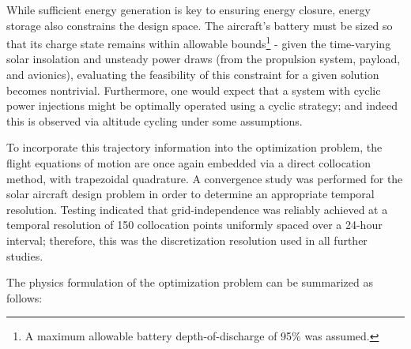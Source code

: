 While sufficient energy generation is key to ensuring energy closure, energy storage also constrains the design space. The aircraft's battery must be sized so that its charge state remains within allowable bounds\footnote{A maximum allowable battery depth-of-discharge of 95\% was assumed.} - given the time-varying solar insolation and unsteady power draws (from the propulsion system, payload, and avionics), evaluating the feasibility of this constraint for a given solution becomes nontrivial. Furthermore, one would expect that a system with cyclic power injections might be optimally operated using a cyclic strategy; and indeed this is observed via altitude cycling under some assumptions.

To incorporate this trajectory information into the optimization problem, the flight equations of motion are once again embedded via a direct collocation method, with trapezoidal quadrature. A convergence study was performed for the solar aircraft design problem in order to determine an appropriate temporal resolution. Testing indicated that grid-independence was reliably achieved at a temporal resolution of 150 collocation points uniformly spaced over a 24-hour interval; therefore, this was the discretization resolution used in all further studies.

The physics formulation of the optimization problem can be summarized as follows:

